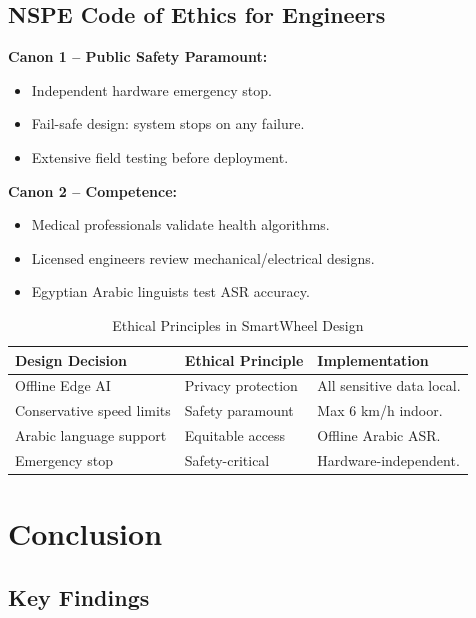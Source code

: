 \documentclass[12pt,a4paper]{report}
\begin{document}
\subsection{NSPE Code of Ethics for Engineers}

\textbf{Canon 1 -- Public Safety Paramount:}
\begin{itemize}
    \item Independent hardware emergency stop.
    \item Fail-safe design: system stops on any failure.
    \item Extensive field testing before deployment.
\end{itemize}

\textbf{Canon 2 -- Competence:}
\begin{itemize}
    \item Medical professionals validate health algorithms.
    \item Licensed engineers review mechanical/electrical designs.
    \item Egyptian Arabic linguists test ASR accuracy.
\end{itemize}

\begin{table}[H]
\centering
\caption{Ethical Principles in SmartWheel Design}
\label{tab:ethics_application}
\begin{tabularx}{\textwidth}{@{}p{4cm}p{4cm}X@{}}
\toprule
\textbf{Design Decision} & \textbf{Ethical Principle} & \textbf{Implementation} \\
\midrule
Offline Edge AI          & Privacy protection \cite{egypt_law_151} & All sensitive data local. \\
Conservative speed limits & Safety paramount \cite{nspe_code}       & Max 6 km/h indoor. \\
Arabic language support   & Equitable access \cite{acm_ieee_code}   & Offline Arabic ASR. \\
Emergency stop            & Safety-critical \cite{iso13482}         & Hardware-independent. \\
\bottomrule
\end{tabularx}
\end{table}

\section{Conclusion}

\subsection{Key Findings}
\end{document}
